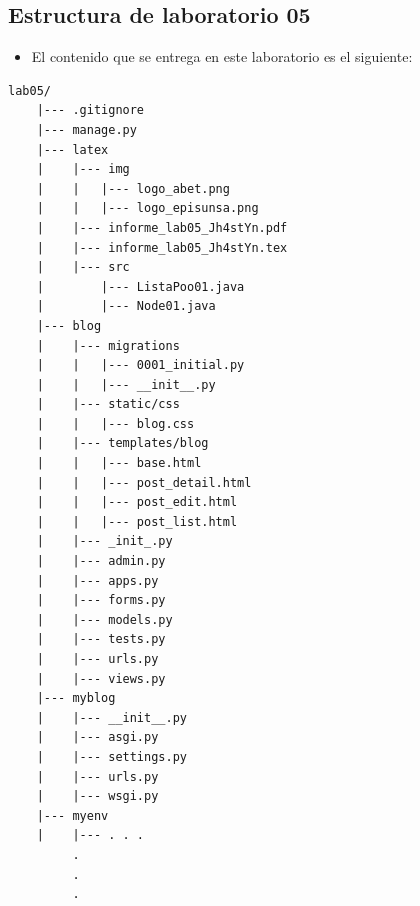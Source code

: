 \documentclass{article}
\begin{document}
        

        

        
 
    \subsection{Estructura de laboratorio 05}
	\begin{itemize}	
		\item El contenido que se entrega en este laboratorio es el siguiente:
	\end{itemize}

    \begin{lstlisting}[style=ascii-tree]
    lab05/
    |--- .gitignore
    |--- manage.py
    |--- latex
    |    |--- img
    |    |   |--- logo_abet.png
    |    |   |--- logo_episunsa.png 
    |    |--- informe_lab05_Jh4stYn.pdf    
    |    |--- informe_lab05_Jh4stYn.tex
    |    |--- src
    |        |--- ListaPoo01.java
    |        |--- Node01.java
    |--- blog
    |    |--- migrations
    |    |   |--- 0001_initial.py
    |    |   |--- __init__.py 
    |    |--- static/css
    |    |   |--- blog.css
    |    |--- templates/blog
    |    |   |--- base.html
    |    |   |--- post_detail.html 
    |    |   |--- post_edit.html 
    |    |   |--- post_list.html 
    |    |--- _init_.py   
    |    |--- admin.py
    |    |--- apps.py
    |    |--- forms.py
    |    |--- models.py
    |    |--- tests.py
    |    |--- urls.py
    |    |--- views.py
    |--- myblog
    |    |--- __init__.py
    |    |--- asgi.py
    |    |--- settings.py
    |    |--- urls.py
    |    |--- wsgi.py
    |--- myenv
    |    |--- . . .
         .
         .   
         .
    \end{lstlisting}    
    
\end{document}
